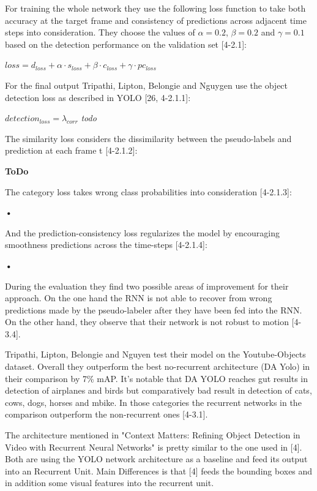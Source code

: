 \documentclass[conference]{IEEEtran}
\begin{document}
For training the whole network they use the following loss function to take both accuracy at the target frame and consistency of predictions across adjacent time steps into consideration. They choose the values of $\alpha = 0.2$, $\beta = 0.2$ and $\gamma = 0.1$ based on the detection performance on the validation set [4-2.1]: \newline

$ loss = d_{loss} + \alpha \cdot s_{loss} + \beta \cdot c_{loss} + \gamma \cdot pc_{loss} $ \newline

For the final output Tripathi, Lipton, Belongie and Nguygen use the object detection loss as described in YOLO [26, 4-2.1.1]: \newline

$ detection_{loss} = \lambda_{corr} $ \textit{todo}

The similarity loss considers the dissimilarity between the pseudo-labels and prediction at each frame t [4-2.1.2]: \newline

\textbf{ToDo}

The category loss takes wrong class probabilities into consideration [4-2.1.3]:  

\textbf{•}

And the prediction-consistency loss regularizes the model by encouraging smoothness predictions across the time-steps [4-2.1.4]:

\textbf{•}

During the evaluation they find two possible areas of improvement for their approach. On the one hand the RNN is not able to recover from wrong predictions made by the pseudo-labeler after they have been fed into the RNN.  On the other hand, they observe that their network is not robust to motion [4-3.4].

Tripathi, Lipton, Belongie and Nguyen test their model on the Youtube-Objects dataset. Overall they outperform the best no-recurrent architecture (DA Yolo) in their comparison by 7\% mAP. It's notable that DA YOLO reaches gut results in detection of airplanes and birds but comparatively bad result in detection of cats, cows, dogs, horses and mbike. In those categories the recurrent networks in the comparison outperform the non-recurrent ones [4-3.1]. \newline

The architecture mentioned in "Context Matters: Refining Object Detection in Video with Recurrent Neural Networks" is pretty similar to the one used in [4]. Both are using the YOLO network architecture as a baseline and feed its output into an Recurrent Unit. Main Differences is that [4] feeds the bounding boxes and in addition some visual features into the recurrent unit.  
\end{document}
